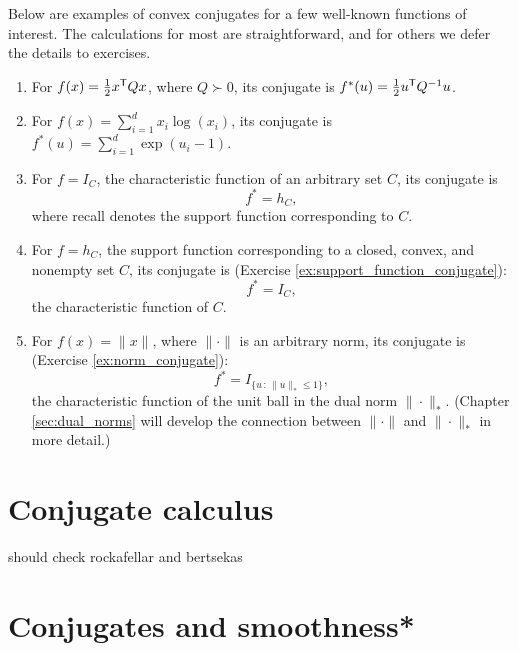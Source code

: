 \begin{Example}
Below are examples of convex conjugates for a few well-known functions of
interest. The calculations for most are straightforward, and for others we defer
the details to exercises. 

\begin{enumerate}[label=\alph*., ref=\alph*]
\item For $f(x) = \frac{1}{2} x^{\mathsf{T}} Q x$, where $Q \succ 0$, its conjugate is
  $f^*(u) = \frac{1}{2} u^{\mathsf{T}} Q^{-1} u$.

\item For $f(x) = \sum_{i=1}^d x_i \log(x_i)$, its conjugate is $f^*(u) =
  \sum_{i=1}^d \exp(u_i - 1)$. 

\item {}   
  For $f = I_C$, the characteristic function of an arbitrary set $C$, its
  conjugate is  
  \[
  f^* = h_C,
  \]
  where recall  denotes the support
  function corresponding to $C$.  

\item {} 
  For $f = h_C$, the support function corresponding to a closed, convex, and
  nonempty set $C$, its conjugate is (Exercise
  \ref{ex:support_function_conjugate}):    
  \[
  f^* = I_C,
  \]
  the characteristic function of $C$. 

\item {}  
  For $f(x) = \|x\|$, where $\|\cdot\|$ is an arbitrary norm, its conjugate is
  (Exercise \ref{ex:norm_conjugate}):  
  \[
  f^* = I_{\{u \,:\, \|u\|_* \leq 1\}},
  \]
  the characteristic function of the unit ball in the dual norm
  $\|\cdot\|_*$. (Chapter \ref{sec:dual_norms} will develop the connection
  between $\|\cdot\|$ and $\|\cdot\|_*$ in more detail.)  
\end{enumerate}
\end{Example}

\section{Conjugate calculus}

should check rockafellar and bertsekas

\section{Conjugates and smoothness*}
\label{sec:conjugates_smoothness}


